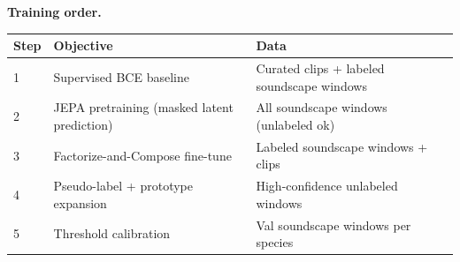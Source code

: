 \documentclass[11pt]{article}
\begin{document}
\bigskip

\noindent\textbf{Training order.}

\medskip
\begin{tabular}{lll}
\toprule
Step & Objective & Data \\
\midrule
1 & Supervised BCE baseline & Curated clips + labeled soundscape windows \\
2 & JEPA pretraining (masked latent prediction) & All soundscape windows (unlabeled ok) \\
3 & Factorize-and-Compose fine-tune & Labeled soundscape windows + clips \\
4 & Pseudo-label + prototype expansion & High-confidence unlabeled windows \\
5 & Threshold calibration & Val soundscape windows per species \\
\bottomrule
\end{tabular}
\end{document}
